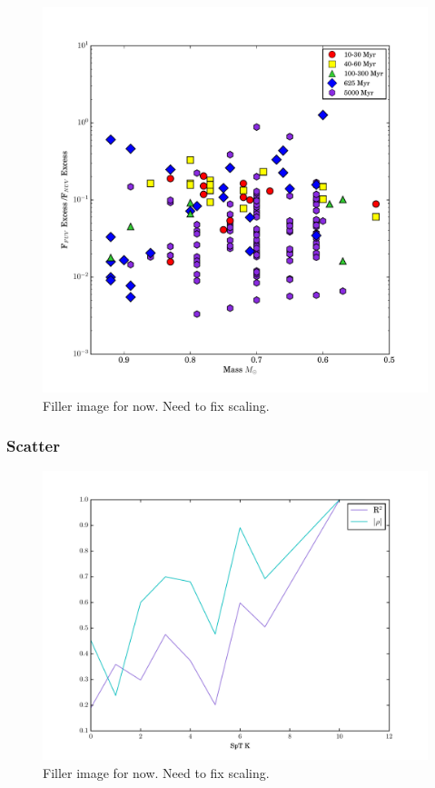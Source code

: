 \documentclass[twocolumn]{aastex62}
\begin{document}
\begin{figure}[h]
\includegraphics[width=\linewidth]{fuv_nuv_vs_mass_NO_J.pdf}
\caption{Filler image for now. Need to fix scaling. \label{fig:fuv_nuv_vs_mass}}
\end{figure}

\subsubsection{Scatter}

\begin{figure}[h]
\includegraphics[width=\linewidth]{R2_vs_spt.pdf}
\caption{Filler image for now. Need to fix scaling. \label{fig:r2_vs_spt}}
\end{figure}
\end{document}
